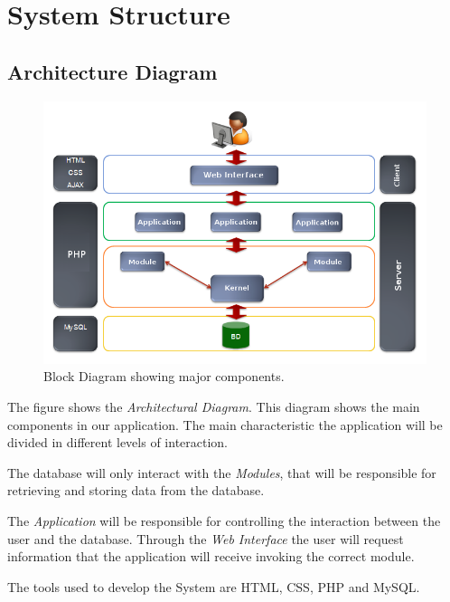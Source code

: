 \documentclass[a4paper,12pt,oneside]{report}
\begin{document}
\section{ System Structure}
\subsection{ Architecture Diagram}
\begin{figure}[h!]
  \begin{center}
   \includegraphics[width=13.7cm]{pics/ar.png}
  \end{center}
\caption{Block Diagram showing major components.}
\end{figure}

The figure shows the \emph{Architectural Diagram}. This diagram shows the main components in our application. The main characteristic the application will be divided in different levels of interaction. 

The database will only interact with the \emph{Modules}, that will be responsible for retrieving and storing data from the database.

 The \emph{Application} will be responsible for controlling the interaction between the user and the database. Through the \emph{Web Interface} the user will request information that the application will receive invoking the correct module.

The tools used to develop the System are HTML, CSS, PHP and MySQL.

\newpage
\end{document}
